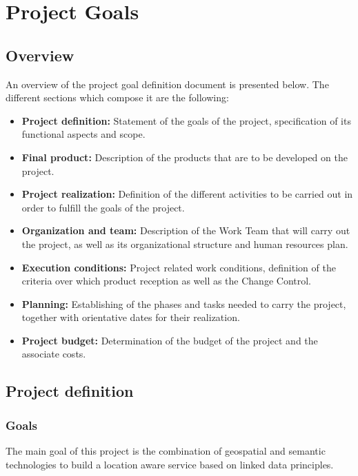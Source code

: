 \chapter{Project Goals}\label{ch:goals}

\section{Overview}

An overview of the project goal definition document is presented below. The different sections which compose it are the following:

\begin{itemize}
\item \textbf{Project definition:} Statement of the goals of the project, specification of its functional aspects and scope.
\item \textbf{Final product:} Description of the products that are to be developed on the project.
\item \textbf{Project realization:} Definition of the different activities to be carried out in order to fulfill the goals of the project.
\item \textbf{Organization and team:} Description of the Work Team that will carry out the project, as well as its organizational structure and human resources plan.
\item \textbf{Execution conditions:} Project related work conditions, definition of the criteria over which product reception as well as the Change Control.
\item \textbf{Planning:} Establishing of the phases and tasks needed to carry the project, together with orientative dates for their realization.
\item \textbf{Project budget:} Determination of the budget of the project and the associate costs.
\end{itemize}

\section{Project definition}

\subsection{Goals}

The main goal of this project is the combination of geospatial and semantic technologies to build a location aware service based on linked data principles.

